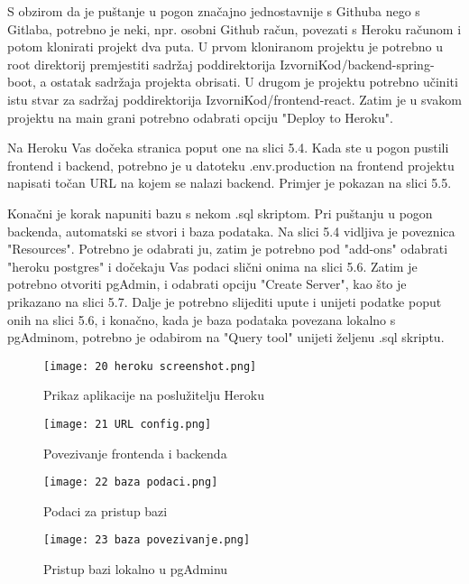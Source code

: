 		S obzirom da je puštanje u pogon značajno jednostavnije s Githuba nego s Gitlaba, potrebno je neki, npr. osobni Github račun, povezati s Heroku računom i potom klonirati projekt dva puta. U prvom kloniranom projektu je potrebno u root direktorij premjestiti sadržaj poddirektorija IzvorniKod/backend-spring-boot, a ostatak sadržaja projekta obrisati. U drugom je projektu potrebno učiniti istu stvar za sadržaj poddirektorija IzvorniKod/frontend-react. Zatim je u svakom projektu na main grani potrebno odabrati opciju "Deploy to Heroku". 
		
		Na Heroku Vas dočeka stranica poput one na slici 5.4. Kada ste u pogon pustili frontend i backend, potrebno je u datoteku .env.production na frontend projektu napisati točan URL na kojem se nalazi backend. Primjer je pokazan na slici 5.5.

		Konačni je korak napuniti bazu s nekom .sql skriptom. Pri puštanju u pogon backenda, automatski se stvori i baza podataka. Na slici 5.4 vidljiva je poveznica "Resources". Potrebno je odabrati ju, zatim je potrebno pod "add-ons" odabrati "heroku postgres" i dočekaju Vas podaci slični onima na slici 5.6. Zatim je potrebno otvoriti pgAdmin, i odabrati opciju "Create Server", kao što je prikazano na slici 5.7. Dalje je potrebno slijediti upute i unijeti podatke poput onih na slici 5.6, i konačno, kada je baza podataka povezana lokalno s pgAdminom, potrebno je odabirom na "Query tool" unijeti željenu .sql skriptu.
		
				\begin{figure}[H]
					\centering
					\texttt{[image: 20 heroku screenshot.png]}
					\caption{Prikaz aplikacije na poslužitelju Heroku}
				\end{figure}
				
				\begin{figure}[H]
					\centering
					\texttt{[image: 21 URL config.png]}
					\caption{Povezivanje frontenda i backenda}
				\end{figure}
				
				\begin{figure}[H]
					\centering
					\texttt{[image: 22 baza podaci.png]}
					\caption{Podaci za pristup bazi}
				\end{figure}
				
				\begin{figure}[H]
					\centering
					\texttt{[image: 23 baza povezivanje.png]}
					\caption{Pristup bazi lokalno u pgAdminu}
				\end{figure}

			\eject